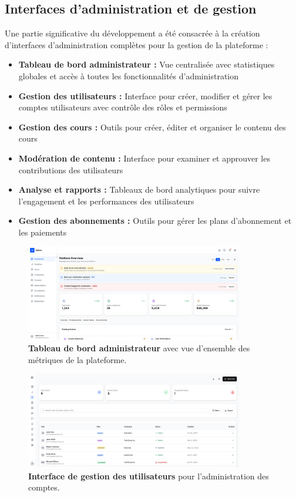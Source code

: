 \subsection{Interfaces d'administration et de gestion}

Une partie significative du développement a été consacrée à la création d'interfaces d'administration complètes pour la gestion de la plateforme :

\begin{itemize}
  \item \textbf{Tableau de bord administrateur :} Vue centralisée avec statistiques globales et accès à toutes les fonctionnalités d'administration
  \item \textbf{Gestion des utilisateurs :} Interface pour créer, modifier et gérer les comptes utilisateurs avec contrôle des rôles et permissions
  \item \textbf{Gestion des cours :} Outils pour créer, éditer et organiser le contenu des cours
  \item \textbf{Modération de contenu :} Interface pour examiner et approuver les contributions des utilisateurs
  \item \textbf{Analyse et rapports :} Tableaux de bord analytiques pour suivre l'engagement et les performances des utilisateurs
  \item \textbf{Gestion des abonnements :} Outils pour gérer les plans d'abonnement et les paiements
\end{itemize}

\begin{figure}[h!]
  \centering
  \includegraphics[width=0.85\textwidth,keepaspectratio]{old-reports/week_4_img/admin.jpeg}
  \caption{\textbf{Tableau de bord administrateur} avec vue d'ensemble des métriques de la plateforme.}
  \label{fig:admin_dashboard}
\end{figure}

\begin{figure}[h!]
  \centering
  \includegraphics[width=0.85\textwidth,keepaspectratio]{old-reports/week_4_img/usrmana.jpeg}
  \caption{\textbf{Interface de gestion des utilisateurs} pour l'administration des comptes.}
  \label{fig:user_management}
\end{figure}

